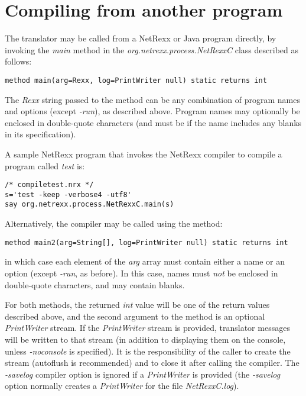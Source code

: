 \section{Compiling from another program}

The translator may be called from a NetRexx or Java program directly, by
invoking the \emph{main} method in the \emph{org.netrexx.process.NetRexxC}
class described as follows:
\begin{verbatim}
method main(arg=Rexx, log=PrintWriter null) static returns int
\end{verbatim}
The \emph{Rexx} string passed to the method can be any combination of
program names and options (except \emph{-run}), as described above.
Program names may optionally be enclosed in double-quote characters (and
must be if the name includes any blanks in its specification).

A sample NetRexx program that invokes the NetRexx compiler to compile a
program called \emph{test} is:
\begin{verbatim}
/* compiletest.nrx */
s='test -keep -verbose4 -utf8'
say org.netrexx.process.NetRexxC.main(s)
\end{verbatim}

Alternatively, the compiler may be called using the method:
\begin{verbatim}
method main2(arg=String[], log=PrintWriter null) static returns int
\end{verbatim}
in which case each element of the \emph{arg} array must contain
either a name or an option (except \emph{-run}, as before).  In this
case, names must \emph{not} be enclosed in double-quote characters, and
may contain blanks.

For both methods, the returned \emph{int} value will be one of the
return values described above, and the second argument to the method is
an optional \emph{PrintWriter} stream.  If the \emph{PrintWriter} stream
is provided, translator messages will be written to that stream (in
addition to displaying them on the console, unless \emph{-noconsole} is
specified).
It is the responsibility of the caller to create the stream (autoflush
is recommended) and to close it after calling the compiler.
The \emph{-savelog} compiler option is ignored if a \emph{PrintWriter}
is provided (the \emph{-savelog} option normally creates
a \emph{PrintWriter} for the file \emph{NetRexxC.log}).

